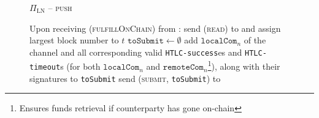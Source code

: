 \begin{figure}[H]
\begin{protocolbox}{$\Pi_{\mathrm{LN}}$ -- \textsc{push}}
\begin{algorithmic}[1]
        \State Upon receiving (\textsc{fulfillOnChain}) from \environment:
        \label{alg:protocol:pay:foc:top}
        \Indent
          \State send (\textsc{read}) to \ledger{} and assign largest block
          number to $t$
          \label{alg:protocol:pay:foc:read}
          \State $\mathtt{toSubmit} \gets \emptyset$
          \label{alg:protocol:pay:foc:tosubmit}
              \State add $\mathtt{localCom}_n$ of the channel and all
              corresponding valid \texttt{HTLC-success}es and
              \texttt{HTLC-timeout}s (for both $\mathtt{localCom}_n$ and
              $\mathtt{remoteCom}_n$\footnote{Ensures funds retrieval if
              counterparty has gone on-chain}), along with their signatures to
              \texttt{toSubmit}
            \EndIf
          \EndFor
          \State send (\textsc{submit}, \texttt{toSubmit}) to \ledger
          \label{alg:protocol:pay:foc:submit}
        \EndIndent
      \end{algorithmic}
    \end{protocolbox}
    \caption{}
    \label{alg:protocol:pay:push}
  \end{figure}


